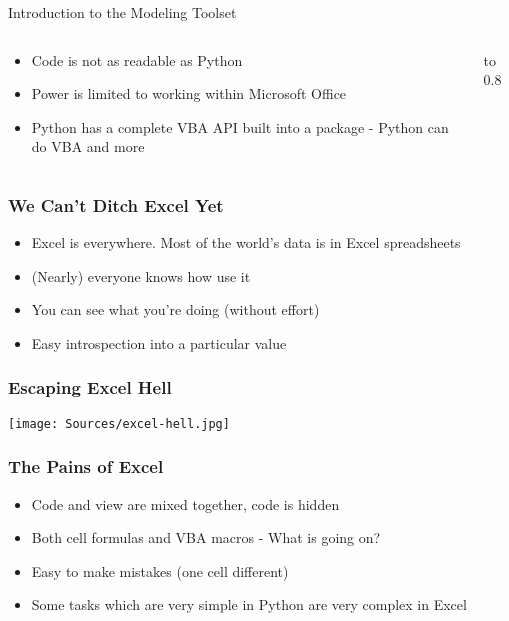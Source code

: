 \documentclass[handout, 11pt]{beamer}
\begin{document}
\begin{section}{Introduction to the Modeling Toolset}
\begin{frame}
\begin{columns}
\begin{column}{0.5\textwidth}
{\begin{itemize}
\item Code is not as readable as Python
\vfill
\item Power is limited to working within Microsoft Office
\vfill
\item Python has a complete VBA API built into a package - Python can do VBA and more
\end{itemize}}
\end{column}
\begin{column}{0.5\textwidth}
\vbox to 0.8
\end{column}
\end{columns}
\end{frame}
\begin{frame}
\frametitle{We Can't Ditch Excel Yet}
\begin{itemize}
\item Excel is everywhere. Most of the world's data is in Excel spreadsheets
\vfill
\item (Nearly) everyone knows how use it
\vfill
\item You can see what you're doing (without effort)
\vfill
\item Easy introspection into a particular value
\end{itemize}
\end{frame}
\begin{frame}
\frametitle{Escaping Excel Hell}
\begin{center}
\begin{adjustbox}{width=0.9\textwidth, height=0.8\textheight, keepaspectratio}
\texttt{[image: Sources/excel-hell.jpg]}
\end{adjustbox}
\end{center}
\end{frame}
\begin{frame}
\frametitle{The Pains of Excel}
\begin{itemize}
\item Code and view are mixed together, code is hidden
\vfill
\item Both cell formulas and VBA macros - What is going on?
\vfill
\item Easy to make mistakes (one cell different)
\vfill
\item Some tasks which are very simple in Python are very complex in Excel
\end{itemize}
\end{frame}

\end{section}
\end{document}
